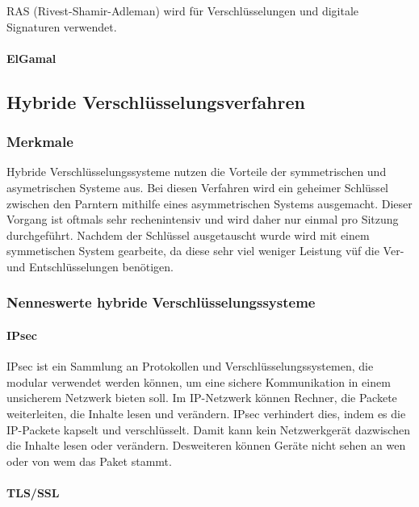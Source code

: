\documentclass[12pt,a4paper]{report}
\begin{document}
RAS (Rivest-Shamir-Adleman) wird für Verschlüsselungen und digitale Signaturen verwendet.

\paragraph{ElGamal}



\subsection{Hybride Verschlüsselungsverfahren}

\subsubsection{Merkmale}

Hybride Verschlüsselungssysteme nutzen die Vorteile der symmetrischen und asymetrischen Systeme aus. Bei diesen Verfahren wird ein geheimer Schlüssel zwischen den Parntern mithilfe eines asymmetrischen Systems ausgemacht. Dieser Vorgang ist oftmals sehr rechenintensiv und wird daher nur einmal pro Sitzung durchgeführt. Nachdem der Schlüssel ausgetauscht wurde wird mit einem symmetischen System gearbeite, da diese sehr viel weniger Leistung vüf die Ver- und Entschlüsselungen benötigen.

\subsubsection{Nenneswerte hybride Verschlüsselungssysteme}

\paragraph{IPsec}

IPsec ist ein Sammlung an Protokollen und Verschlüsselungssystemen, die modular verwendet werden können, um eine sichere Kommunikation in einem unsicherem Netzwerk bieten soll. Im IP-Netzwerk können Rechner, die Packete weiterleiten, die Inhalte lesen und verändern. IPsec verhindert dies, indem es die IP-Packete kapselt und verschlüsselt. Damit kann kein Netzwerkgerät dazwischen die Inhalte lesen oder verändern. Desweiteren können Geräte nicht sehen an wen oder von wem das Paket stammt.

\paragraph{TLS/SSL}
\end{document}
